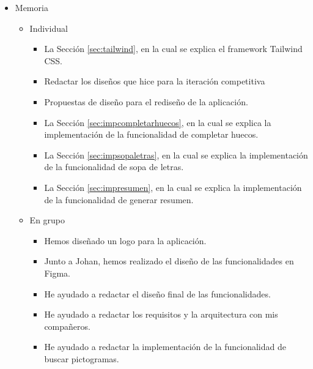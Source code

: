 \begin{itemize}
\begin{itemize}
\begin{itemize}
                    \end{itemize}
          \end{itemize}
    \item Memoria
          \begin{itemize}
              \item Individual
                    \begin{itemize}
                        \item La Sección \ref{sec:tailwind}, en la cual se explica el framework Tailwind CSS.
                        \item Redactar los diseños que hice para la iteración competitiva
                        \item Propuestas de diseño para el rediseño de la aplicación.
                        \item La Sección \ref{sec:impcompletarhuecos}, en la cual se explica la implementación de la funcionalidad de completar huecos.
                        \item La Sección \ref{sec:impsopaletras}, en la cual se explica la implementación de la funcionalidad de sopa de letras.
                        \item La Sección \ref{sec:impresumen}, en la cual se explica la implementación de la funcionalidad de generar resumen.
                    \end{itemize}
              \item En grupo
                    \begin{itemize}
                        \item Hemos diseñado un logo para la aplicación.
                        \item Junto a Johan, hemos realizado el diseño de las funcionalidades en Figma.
                        \item He ayudado a redactar el diseño final de las funcionalidades.
                        \item He ayudado a redactar los requisitos y la arquitectura con mis compañeros.
                        \item He ayudado a redactar la implementación de la funcionalidad de buscar pictogramas.
                    \end{itemize}
          \end{itemize}
\end{itemize}

